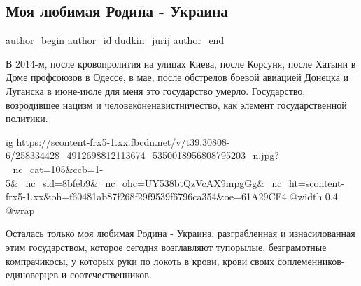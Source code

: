  
 
 
 
 
 
\subsection{Моя любимая Родина - Украина}
\label{sec:21_11_2021.fb.dudkin_jurij.1.rodina_ukraina}
 
\ifcmt
 author_begin
   author_id dudkin_jurij
 author_end
\fi

В 2014-м, после кровопролития на улицах Киева, после Корсуня, после Хатыни в
Доме профсоюзов в Одессе, в мае,  после обстрелов боевой авиацией Донецка и
Луганска в июне-июле для меня это государство умерло. Государство, возродившее
нацизм и человеконенавистничество, как элемент государственной политики.

\ifcmt
  ig https://scontent-frx5-1.xx.fbcdn.net/v/t39.30808-6/258334428_4912698812113674_5350018956808795203_n.jpg?_nc_cat=105&ccb=1-5&_nc_sid=8bfeb9&_nc_ohc=UY538btQzVcAX9mpgGg&_nc_ht=scontent-frx5-1.xx&oh=f60481ab87f268f29f9539f6796ca354&oe=61A29CF4
  @width 0.4
  @wrap 
\fi

Осталась только моя любимая Родина - Украина, разграбленная и изнасилованная
этим государством, которое сегодня возглавляют тупорылые, безграмотные
компрачикосы, у которых руки по локоть в крови, крови своих
соплеменников-единоверцев и соотечественников.

